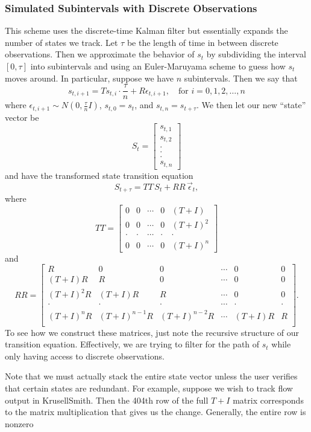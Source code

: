 \documentclass[12 pt, oneside]{article}
\theoremstyle{definition}
\theoremstyle{definition}
\theoremstyle{definition}
\begin{document}
\subsubsection{Simulated Subintervals with Discrete Observations}
This scheme uses the discrete-time Kalman filter but essentially expands the number of states we track. Let $\tau$ be the length of time in between discrete observations. Then we approximate the behavior of $s_t$ by subdividing the interval $[0,\tau]$ into subintervals and using an Euler-Maruyama scheme to guess how $s_t$ moves around. In particular, suppose we have $n$ subintervals. Then we say that
\[s_{t,i+1} = Ts_{t, i}\cdot\dfrac{\tau}{n} + R\epsilon_{t,i+1},\quad\text{for }i =0,1,2,\dots, n  \]
where $\epsilon_{t,i+1}\sim N(0, \frac{\tau}{n}I)$, $s_{t,0} = s_t$, and $s_{t,n} = s_{t+\tau}$. We then let our new ``state'' vector be
\[S_t =
\begin{bmatrix}
  s_{t,1}\\s_{t,2}\\.\\.\\.\\s_{t,n}
\end{bmatrix}
\]
and have the transformed state transition equation
\[S_{t+\tau} = TT\, S_t + RR\,\vec{\epsilon}_t, \]
where
\[TT =
\begin{bmatrix}
  0 & 0 & \cdots &  0 & (T+I)\\
0 & 0 & \cdots & 0 & (T+I)^2\\
\cdot & \cdot & \cdots & \cdot & \cdot\\
0 & 0 & \cdots & 0 & (T+I)^n
\end{bmatrix}
\]
and
\[RR =
\begin{bmatrix}
  R & 0 & 0 & \cdots & 0 & 0 \\
(T+I)R & R & 0 & \cdots & 0 & 0\\
(T+I)^2R & (T+I)R & R & \cdots & 0 & 0\\
\cdot & \cdot &  \cdot & \cdots & \cdot & \cdot\\
(T+I)^nR & (T+I)^{n-1}R & (T+I)^{n-2}R & \cdots & (T+I)R & R\\
\end{bmatrix}.
\]
To see how we construct these matrices, just note the recursive structure of our transition equation. Effectively, we are trying to filter for the path of $s_t$ while only having access to discrete observations.

Note that we must actually stack the entire state vector unless the user verifies that certain states are redundant. For example, suppose we wish to track flow output in KrusellSmith. Then the 404th row of the full $T+I$ matrix corresponds to the matrix multiplication that gives us the change. Generally, the entire row is nonzero
\end{document}
